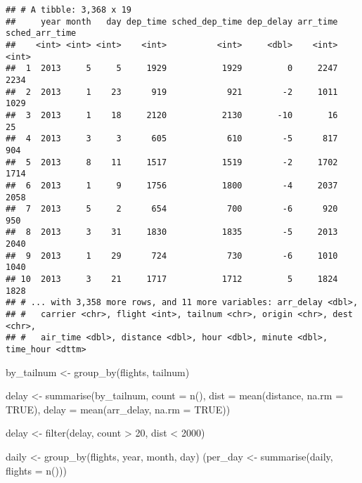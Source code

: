 \documentclass[
]{article}
\newenvironment{Shaded}{\begin{snugshade}}{\end{snugshade}}
\newcommand{\AttributeTok}[1]{\textcolor[rgb]{0.77,0.63,0.00}{#1}}
\newcommand{\ConstantTok}[1]{\textcolor[rgb]{0.00,0.00,0.00}{#1}}
\newcommand{\DecValTok}[1]{\textcolor[rgb]{0.00,0.00,0.81}{#1}}
\newcommand{\FunctionTok}[1]{\textcolor[rgb]{0.00,0.00,0.00}{#1}}
\newcommand{\NormalTok}[1]{#1}
\newcommand{\OtherTok}[1]{\textcolor[rgb]{0.56,0.35,0.01}{#1}}
\newcommand{\SpecialCharTok}[1]{\textcolor[rgb]{0.00,0.00,0.00}{#1}}
\begin{document}
\begin{verbatim}
## # A tibble: 3,368 x 19
##     year month   day dep_time sched_dep_time dep_delay arr_time sched_arr_time
##    <int> <int> <int>    <int>          <int>     <dbl>    <int>          <int>
##  1  2013     5     5     1929           1929         0     2247           2234
##  2  2013     1    23      919            921        -2     1011           1029
##  3  2013     1    18     2120           2130       -10       16             25
##  4  2013     3     3      605            610        -5      817            904
##  5  2013     8    11     1517           1519        -2     1702           1714
##  6  2013     1     9     1756           1800        -4     2037           2058
##  7  2013     5     2      654            700        -6      920            950
##  8  2013     3    31     1830           1835        -5     2013           2040
##  9  2013     1    29      724            730        -6     1010           1040
## 10  2013     3    21     1717           1712         5     1824           1828
## # ... with 3,358 more rows, and 11 more variables: arr_delay <dbl>,
## #   carrier <chr>, flight <int>, tailnum <chr>, origin <chr>, dest <chr>,
## #   air_time <dbl>, distance <dbl>, hour <dbl>, minute <dbl>, time_hour <dttm>
\end{verbatim}

\begin{Shaded}
\begin{Highlighting}[]
\NormalTok{by\_tailnum }\OtherTok{\textless{}{-}} \FunctionTok{group\_by}\NormalTok{(flights, tailnum) }

\NormalTok{delay }\OtherTok{\textless{}{-}} \FunctionTok{summarise}\NormalTok{(by\_tailnum, }
  \AttributeTok{count =} \FunctionTok{n}\NormalTok{(),}
  \AttributeTok{dist =} \FunctionTok{mean}\NormalTok{(distance, }\AttributeTok{na.rm =} \ConstantTok{TRUE}\NormalTok{),}
  \AttributeTok{delay =} \FunctionTok{mean}\NormalTok{(arr\_delay, }\AttributeTok{na.rm =} \ConstantTok{TRUE}\NormalTok{))}

\NormalTok{delay }\OtherTok{\textless{}{-}} \FunctionTok{filter}\NormalTok{(delay, count }\SpecialCharTok{\textgreater{}} \DecValTok{20}\NormalTok{, dist }\SpecialCharTok{\textless{}} \DecValTok{2000}\NormalTok{) }

\NormalTok{daily }\OtherTok{\textless{}{-}} \FunctionTok{group\_by}\NormalTok{(flights, year, month, day)}
\NormalTok{(per\_day   }\OtherTok{\textless{}{-}} \FunctionTok{summarise}\NormalTok{(daily, }\AttributeTok{flights =} \FunctionTok{n}\NormalTok{()))}
\end{Highlighting}
\end{Shaded}
\end{document}
